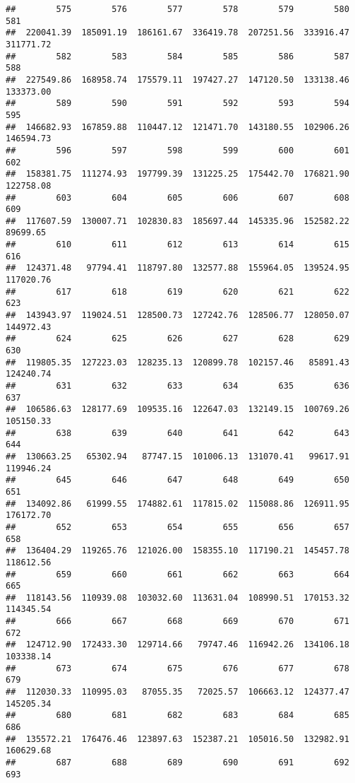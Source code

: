 \documentclass[
]{article}
\begin{document}
\begin{verbatim}
##        575        576        577        578        579        580        581 
##  220041.39  185091.19  186161.67  336419.78  207251.56  333916.47  311771.72 
##        582        583        584        585        586        587        588 
##  227549.86  168958.74  175579.11  197427.27  147120.50  133138.46  133373.00 
##        589        590        591        592        593        594        595 
##  146682.93  167859.88  110447.12  121471.70  143180.55  102906.26  146594.73 
##        596        597        598        599        600        601        602 
##  158381.75  111274.93  197799.39  131225.25  175442.70  176821.90  122758.08 
##        603        604        605        606        607        608        609 
##  117607.59  130007.71  102830.83  185697.44  145335.96  152582.22   89699.65 
##        610        611        612        613        614        615        616 
##  124371.48   97794.41  118797.80  132577.88  155964.05  139524.95  117020.76 
##        617        618        619        620        621        622        623 
##  143943.97  119024.51  128500.73  127242.76  128506.77  128050.07  144972.43 
##        624        625        626        627        628        629        630 
##  119805.35  127223.03  128235.13  120899.78  102157.46   85891.43  124240.74 
##        631        632        633        634        635        636        637 
##  106586.63  128177.69  109535.16  122647.03  132149.15  100769.26  105150.33 
##        638        639        640        641        642        643        644 
##  130663.25   65302.94   87747.15  101006.13  131070.41   99617.91  119946.24 
##        645        646        647        648        649        650        651 
##  134092.86   61999.55  174882.61  117815.02  115088.86  126911.95  176172.70 
##        652        653        654        655        656        657        658 
##  136404.29  119265.76  121026.00  158355.10  117190.21  145457.78  118612.56 
##        659        660        661        662        663        664        665 
##  118143.56  110939.08  103032.60  113631.04  108990.51  170153.32  114345.54 
##        666        667        668        669        670        671        672 
##  124712.90  172433.30  129714.66   79747.46  116942.26  134106.18  103338.14 
##        673        674        675        676        677        678        679 
##  112030.33  110995.03   87055.35   72025.57  106663.12  124377.47  145205.34 
##        680        681        682        683        684        685        686 
##  135572.21  176476.46  123897.63  152387.21  105016.50  132982.91  160629.68 
##        687        688        689        690        691        692        693 

\end{verbatim}
\end{document}
